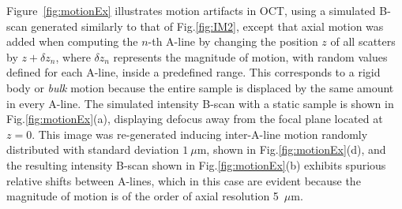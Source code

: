 Figure~\ref{fig:motionEx} illustrates motion artifacts in OCT, using a simulated B-scan generated similarly to that of Fig.\ref{fig:IM2}, except that axial motion was added when computing the $n$-th A-line by changing the position $z$ of all scatters by $z + \delta z_n$, where $\delta z_n$ represents the magnitude of motion, with random values defined for each A-line, inside a predefined range. This corresponds to a rigid body or \textit{bulk} motion because the entire sample is displaced by the same amount in every A-line. The simulated intensity B-scan with a static sample is shown in Fig.\ref{fig:motionEx}(a), displaying defocus away from the focal plane located at $z=0$. This image was re-generated inducing inter-A-line motion randomly distributed with standard deviation $1~\mu$m, shown in Fig.\ref{fig:motionEx}(d), and the resulting intensity B-scan shown in Fig.\ref{fig:motionEx}(b) exhibits spurious relative shifts between A-lines, which in this case are evident because the magnitude of motion is of the order of axial resolution 5~$\mu$m.

